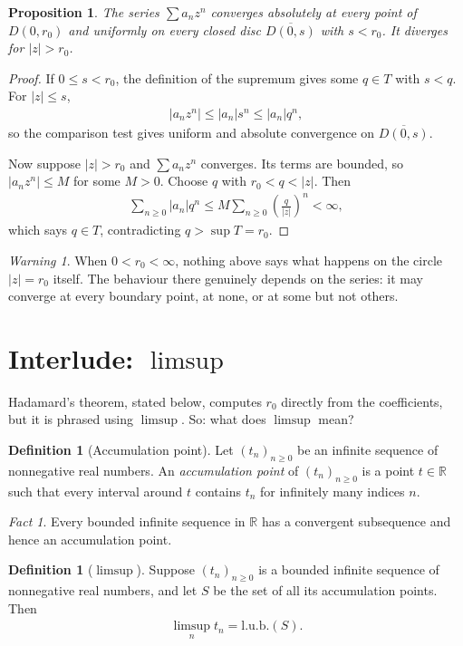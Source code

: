 \documentclass[11pt]{article}
\theoremstyle{plain}
\newtheorem{proposition}[theorem]{Proposition}
\theoremstyle{definition}
\newtheorem{definition}[theorem]{Definition}
\theoremstyle{remark}
\newtheorem*{fact}{Fact}
\newtheorem*{warning}{Warning}
\numberwithin{equation}{section}
\newcommand{\be}{\begin{eqnarray}}
\newcommand{\ee}{\end{eqnarray}}
\newcommand{\R}{\mathbb{R}}
\begin{document}
\begin{proposition}
The series $\sum a_nz^n$ converges absolutely at every point of $D(0,r_0)$
and uniformly on every closed disc $\overline{D(0,s)}$ with $s<r_0$. It
diverges for $|z|>r_0$.
\end{proposition}

\begin{proof}
If $0\leq s<r_0$, the definition of the supremum gives some $q\in T$ with
$s<q$. For $|z|\leq s$,
\be
 |a_nz^n|\leq |a_n|s^n\leq |a_n|q^n,
\ee
so the comparison test gives uniform and absolute convergence on
$\overline{D(0,s)}$.

Now suppose $|z|>r_0$ and $\sum a_nz^n$ converges. Its terms are bounded, so
$|a_nz^n|\leq M$ for some $M>0$. Choose $q$ with $r_0<q<|z|$. Then
\be
 \sum_{n\geq0}|a_n|q^n
 \leq M\sum_{n\geq0}\left(\frac q{|z|}\right)^n<\infty,
\ee
which says $q\in T$, contradicting $q>\sup T=r_0$.
\end{proof}

\begin{warning}
When $0<r_0<\infty$, nothing above says what happens on the circle
$|z|=r_0$ itself. The behaviour there genuinely depends on the series: it may
converge at every boundary point, at none, or at some but not others.
\end{warning}

\section{Interlude: \texorpdfstring{$\limsup$}{limsup}}

Hadamard's theorem, stated below, computes $r_0$ directly from the
coefficients, but it is phrased using $\limsup$. So: what does $\limsup$
mean?

\begin{definition}[Accumulation point]
Let $(t_n)_{n\geq0}$ be an infinite sequence of nonnegative real numbers. An
\emph{accumulation point} of $(t_n)_{n\geq0}$ is a point $t\in\R$ such that
every interval around $t$ contains $t_n$ for infinitely many indices $n$.
\end{definition}

\begin{fact}
Every bounded infinite sequence in $\R$ has a convergent subsequence and hence
an accumulation point.
\end{fact}

\begin{definition}[$\limsup$]
Suppose $(t_n)_{n\geq0}$ is a bounded infinite sequence of nonnegative real
numbers, and let $S$ be the set of all its accumulation points. Then
\be
 \limsup_{n} t_n=\text{l.u.b.}(S).
\ee
\end{definition}
\end{document}
